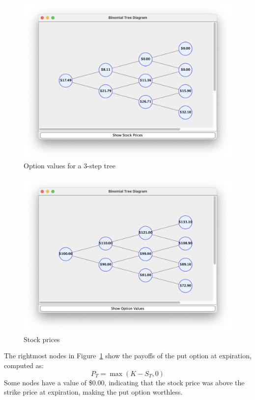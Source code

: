 \documentclass{article}
\begin{document}
    \clearpage

    \begin{figure}[H]
        \centering
        \includegraphics[scale=0.4]{Example1_BinTree_OptionValue}
        \caption{Option values for a 3-step tree}
        \label{fig:3_step_option_tree}
    \end{figure}

    \begin{figure}[H]
        \centering
        \includegraphics[scale=0.4]{Example1_BinTree_StockPrice}
        \caption{Stock prices}
        \label{fig:3_step_stock_price_tree}
    \end{figure}

    The rightmost nodes in Figure~\ref{fig:3_step_option_tree} show the payoffs of the put option at expiration, computed as:
    \[
    P_T = \max(K - S_T, 0)
    \]
    Some nodes have a value of \$0.00, indicating that the stock price was above the strike price at expiration, making the put option worthless.
\end{document}
